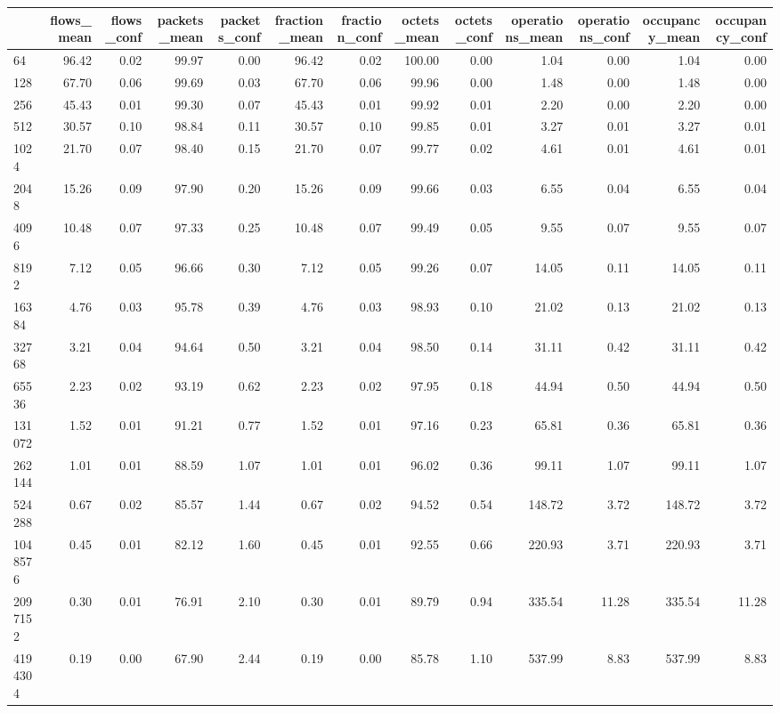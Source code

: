 \begin{tabular}{lrrrrrrrrrrrr}
\toprule
 & flows_mean & flows_conf & packets_mean & packets_conf & fraction_mean & fraction_conf & octets_mean & octets_conf & operations_mean & operations_conf & occupancy_mean & occupancy_conf \\
\midrule
64 & 96.42 & 0.02 & 99.97 & 0.00 & 96.42 & 0.02 & 100.00 & 0.00 & 1.04 & 0.00 & 1.04 & 0.00 \\
128 & 67.70 & 0.06 & 99.69 & 0.03 & 67.70 & 0.06 & 99.96 & 0.00 & 1.48 & 0.00 & 1.48 & 0.00 \\
256 & 45.43 & 0.01 & 99.30 & 0.07 & 45.43 & 0.01 & 99.92 & 0.01 & 2.20 & 0.00 & 2.20 & 0.00 \\
512 & 30.57 & 0.10 & 98.84 & 0.11 & 30.57 & 0.10 & 99.85 & 0.01 & 3.27 & 0.01 & 3.27 & 0.01 \\
1024 & 21.70 & 0.07 & 98.40 & 0.15 & 21.70 & 0.07 & 99.77 & 0.02 & 4.61 & 0.01 & 4.61 & 0.01 \\
2048 & 15.26 & 0.09 & 97.90 & 0.20 & 15.26 & 0.09 & 99.66 & 0.03 & 6.55 & 0.04 & 6.55 & 0.04 \\
4096 & 10.48 & 0.07 & 97.33 & 0.25 & 10.48 & 0.07 & 99.49 & 0.05 & 9.55 & 0.07 & 9.55 & 0.07 \\
8192 & 7.12 & 0.05 & 96.66 & 0.30 & 7.12 & 0.05 & 99.26 & 0.07 & 14.05 & 0.11 & 14.05 & 0.11 \\
16384 & 4.76 & 0.03 & 95.78 & 0.39 & 4.76 & 0.03 & 98.93 & 0.10 & 21.02 & 0.13 & 21.02 & 0.13 \\
32768 & 3.21 & 0.04 & 94.64 & 0.50 & 3.21 & 0.04 & 98.50 & 0.14 & 31.11 & 0.42 & 31.11 & 0.42 \\
65536 & 2.23 & 0.02 & 93.19 & 0.62 & 2.23 & 0.02 & 97.95 & 0.18 & 44.94 & 0.50 & 44.94 & 0.50 \\
131072 & 1.52 & 0.01 & 91.21 & 0.77 & 1.52 & 0.01 & 97.16 & 0.23 & 65.81 & 0.36 & 65.81 & 0.36 \\
262144 & 1.01 & 0.01 & 88.59 & 1.07 & 1.01 & 0.01 & 96.02 & 0.36 & 99.11 & 1.07 & 99.11 & 1.07 \\
524288 & 0.67 & 0.02 & 85.57 & 1.44 & 0.67 & 0.02 & 94.52 & 0.54 & 148.72 & 3.72 & 148.72 & 3.72 \\
1048576 & 0.45 & 0.01 & 82.12 & 1.60 & 0.45 & 0.01 & 92.55 & 0.66 & 220.93 & 3.71 & 220.93 & 3.71 \\
2097152 & 0.30 & 0.01 & 76.91 & 2.10 & 0.30 & 0.01 & 89.79 & 0.94 & 335.54 & 11.28 & 335.54 & 11.28 \\
4194304 & 0.19 & 0.00 & 67.90 & 2.44 & 0.19 & 0.00 & 85.78 & 1.10 & 537.99 & 8.83 & 537.99 & 8.83 \\

\end{tabular}
